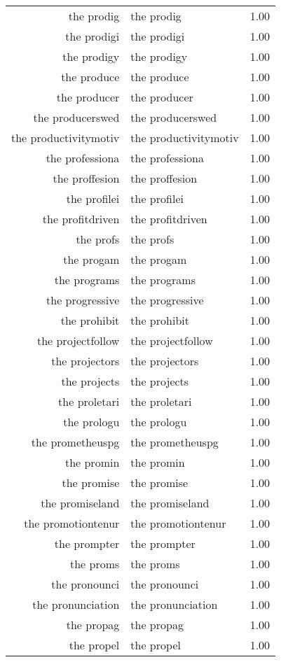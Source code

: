\begin{table}[ht]
\begin{tabular}{rlr}
  the prodig & the prodig & 1.00 \\ 
  the prodigi & the prodigi & 1.00 \\ 
  the prodigy & the prodigy & 1.00 \\ 
  the produce & the produce & 1.00 \\ 
  the producer & the producer & 1.00 \\ 
  the producerswed & the producerswed & 1.00 \\ 
  the productivitymotiv & the productivitymotiv & 1.00 \\ 
  the professiona & the professiona & 1.00 \\ 
  the proffesion & the proffesion & 1.00 \\ 
  the profilei & the profilei & 1.00 \\ 
  the profitdriven & the profitdriven & 1.00 \\ 
  the profs & the profs & 1.00 \\ 
  the progam & the progam & 1.00 \\ 
  the programs & the programs & 1.00 \\ 
  the progressive & the progressive & 1.00 \\ 
  the prohibit & the prohibit & 1.00 \\ 
  the projectfollow & the projectfollow & 1.00 \\ 
  the projectors & the projectors & 1.00 \\ 
  the projects & the projects & 1.00 \\ 
  the proletari & the proletari & 1.00 \\ 
  the prologu & the prologu & 1.00 \\ 
  the prometheuspg & the prometheuspg & 1.00 \\ 
  the promin & the promin & 1.00 \\ 
  the promise & the promise & 1.00 \\ 
  the promiseland & the promiseland & 1.00 \\ 
  the promotiontenur & the promotiontenur & 1.00 \\ 
  the prompter & the prompter & 1.00 \\ 
  the proms & the proms & 1.00 \\ 
  the pronounci & the pronounci & 1.00 \\ 
  the pronunciation & the pronunciation & 1.00 \\ 
  the propag & the propag & 1.00 \\ 
  the propel & the propel & 1.00 \\ 

\end{tabular}
\end{table}
